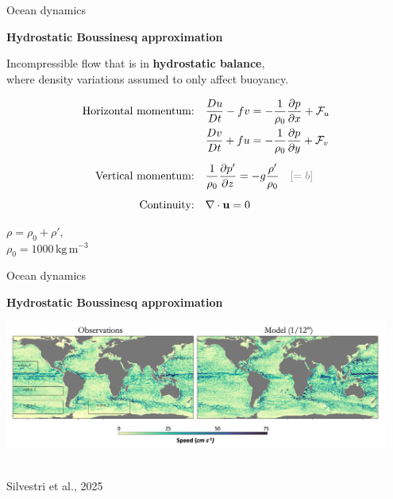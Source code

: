 \documentclass[aspectratio=169,xcolor=dvipsnames]{beamer}
\newcommand\credit[2]{
        \\ \vspace{-0.5em}
        {\color{gray}\scriptsize
        \hfill
        #1
        \hspace{#2}}
        }
\begin{document}
\begin{frame}[t]{Ocean dynamics}

\vspace{-0.5em}

\begin{center}
\textbf{{\large
Hydrostatic Boussinesq approximation
}}
\end{center}

\small 
\center 

\vspace{0em}

Incompressible flow that is in \textbf{hydrostatic balance}, \\
where density variations assumed to only affect buoyancy.

\begin{align*}
\text{Horizontal momentum:} \quad &
\frac{Du}{D t}
- f v
= -\frac{1}{\rho_0} \pdv{p}{x} + \mathcal{F}_u \\
%
 \quad &
\frac{Dv}{D t}
+ f u
= -\frac{1}{\rho_0} \pdv{p}{y} + \mathcal{F}_v \\[0.5em]
%
\text{Vertical momentum:} \quad &
\frac{1}{\rho_0}\pdv{p'}{z} = -g\frac{\rho'}{\rho_0} \textcolor{gray}{\quad\left[=b \right]} \\[0.5em]
%
\text{Continuity:} \quad &
\nabla \cdot \mathbf{u} = 0
\end{align*}

\vspace{-2em}

\begin{flushright}
\begin{minipage}{0.18\textwidth}
\begin{block}{}
    \footnotesize
    $\rho = \rho_0 + \rho',$ \\[0.5em]
    $\rho_0=1000\,\text{kg}\,\text{m}^{-3}$
\end{block}
\end{minipage}
\end{flushright}

\end{frame}

\begin{frame}[t]{Ocean dynamics}
\begin{center}

\vspace{-1.0em}

\textbf{{\large
Hydrostatic Boussinesq approximation
}}

\vspace{2.0em}

\includegraphics[width=0.95\textwidth]{figs/Fig-oceananigans-Silvestri2025-2.png}
\credit{Silvestri et al., 2025}{15pt}

\end{center}
\end{frame}
\end{document}
